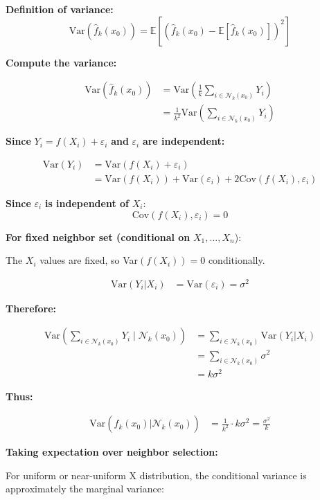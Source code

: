 \documentclass[12pt]{article}
\begin{document}
\begin{solution}
\textbf{Definition of variance:}
\[
\text{Var}(\hat{f}_k(x_0)) = \mathbb{E}[(\hat{f}_k(x_0) - \mathbb{E}[\hat{f}_k(x_0)])^2]
\]

\textbf{Compute the variance:}

\begin{align*}
\text{Var}(\hat{f}_k(x_0)) &= \text{Var}\left(\frac{1}{k}\sum_{i \in \mathcal{N}_k(x_0)} Y_i\right) \\
&= \frac{1}{k^2}\text{Var}\left(\sum_{i \in \mathcal{N}_k(x_0)} Y_i\right)
\end{align*}

\textbf{Since } $Y_i = f(X_i) + \varepsilon_i$ \textbf{ and } $\varepsilon_i$ \textbf{ are independent:}

\begin{align*}
\text{Var}(Y_i) &= \text{Var}(f(X_i) + \varepsilon_i) \\
&= \text{Var}(f(X_i)) + \text{Var}(\varepsilon_i) + 2\text{Cov}(f(X_i), \varepsilon_i)
\end{align*}

\textbf{Since } $\varepsilon_i$ \textbf{ is independent of } $X_i$:
\[
\text{Cov}(f(X_i), \varepsilon_i) = 0
\]

\textbf{For fixed neighbor set (conditional on } $X_1, \ldots, X_n$):

The $X_i$ values are fixed, so Var$(f(X_i)) = 0$ conditionally.

\begin{align*}
\text{Var}(Y_i | X_i) &= \text{Var}(\varepsilon_i) = \sigma^2
\end{align*}

\textbf{Therefore:}

\begin{align*}
\text{Var}\left(\sum_{i \in \mathcal{N}_k(x_0)} Y_i \mid \mathcal{N}_k(x_0)\right) &= \sum_{i \in \mathcal{N}_k(x_0)} \text{Var}(Y_i | X_i) \\
&= \sum_{i \in \mathcal{N}_k(x_0)} \sigma^2 \\
&= k\sigma^2
\end{align*}

\textbf{Thus:}

\begin{align*}
\text{Var}(\hat{f}_k(x_0) | \mathcal{N}_k(x_0)) &= \frac{1}{k^2} \cdot k\sigma^2 = \frac{\sigma^2}{k}
\end{align*}

\textbf{Taking expectation over neighbor selection:}

For uniform or near-uniform X distribution, the conditional variance is approximately the marginal variance:


\end{solution}
\end{document}
